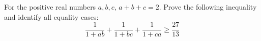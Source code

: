 For the positive real numbers $a,b,c$, $a+b+c=2$.
Prove the following inequality and identify all equality cases:
$$\frac{1}{1+ab}+\frac{1}{1+bc}+\frac{1}{1+ca}\geq \frac{27}{13}$$